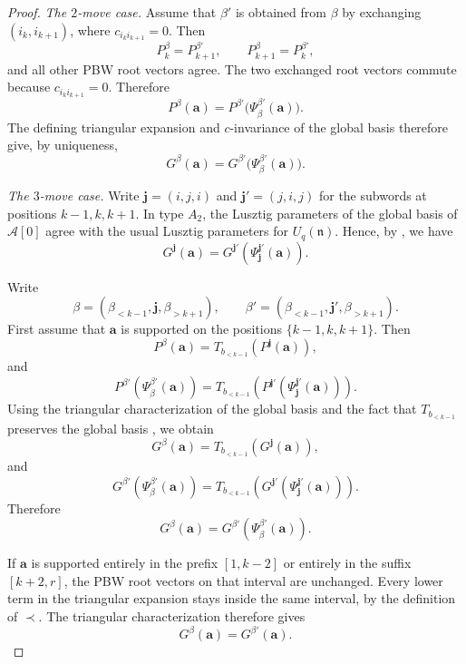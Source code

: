 \documentclass[12pt, reqno]{amsart}
\theoremstyle{plain}
\theoremstyle{definition}
\numberwithin{equation}{section}
\begin{document}
\begin{proof}
\emph{The \(2\)-move case.}
Assume that \(\beta'\) is obtained from \(\beta\) by exchanging
\((i_k,i_{k+1})\), where \(c_{i_ki_{k+1}}=0\). Then
\[
P_k^\beta=P_{k+1}^{\beta'},
\qquad
P_{k+1}^\beta=P_k^{\beta'},
\]
and all other PBW root vectors agree. The two exchanged root vectors
commute because $c_{i_ki_{k+1}}=0$. Therefore
\[
P^\beta(\mathbf a)
=
P^{\beta'}\bigl(\Psi_\beta^{\beta'}(\mathbf a)\bigr).
\]
The defining triangular expansion and $c$-invariance of the global basis
therefore give, by uniqueness,
\[
G^\beta(\mathbf a)
=
G^{\beta'}\bigl(\Psi_\beta^{\beta'}(\mathbf a)\bigr).
\]

\medskip
\noindent\emph{The \(3\)-move case.}
Write $\mathbf j=(i,j,i)$ and $\mathbf j'=(j,i,j)$ for the subwords
at positions $k-1,k,k+1$.
In type \(A_2\), the Lusztig parameters of the global basis of
\(\widehat{\mathcal A}[0]\) agree with the usual Lusztig parameters for
\(U_q(\mathfrak n)\). Hence, by
\cite[Proposition~5.2]{kamnitzer2010mirkovic}, we have
\[
G^{\mathbf j}(\mathbf a)
=
G^{\mathbf j'}\!\left(\Psi_{\mathbf j}^{\mathbf j'}(\mathbf a)\right).
\]

Write
\[
\beta=(\beta_{<k-1},\mathbf j,\beta_{>k+1}),
\qquad
\beta'=(\beta_{<k-1},\mathbf j',\beta_{>k+1}).
\]
First assume that \(\mathbf a\) is supported on the positions
\(\{k-1,k,k+1\}\). Then
\[
P^\beta(\mathbf a)
=
T_{b_{<k-1}}\!\left(P^{\mathbf j}(\mathbf a)\right),
\]
and
\[
P^{\beta'}\!\left(\Psi_\beta^{\beta'}(\mathbf a)\right)
=
T_{b_{<k-1}}\!\left(
P^{\mathbf j'}\!\left(\Psi_{\mathbf j}^{\mathbf j'}(\mathbf a)\right)
\right).
\]
Using the triangular characterization of the global basis and the fact that
\(T_{b_{<k-1}}\) preserves the global basis
\cite[Theorem~3.7]{kashiwara2024braid}, we obtain
\[
G^\beta(\mathbf a)
=
T_{b_{<k-1}}\!\left(G^{\mathbf j}(\mathbf a)\right),
\]
and
\[
G^{\beta'}\!\left(\Psi_\beta^{\beta'}(\mathbf a)\right)
=
T_{b_{<k-1}}\!\left(
G^{\mathbf j'}\!\left(\Psi_{\mathbf j}^{\mathbf j'}(\mathbf a)\right)
\right).
\]
Therefore
\[
G^\beta(\mathbf a)
=
G^{\beta'}\!\left(\Psi_\beta^{\beta'}(\mathbf a)\right).
\]

If $\mathbf a$ is supported entirely in the prefix $[1,k-2]$ or
entirely in the suffix $[k+2,r]$, the PBW root vectors on that interval
are unchanged. Every lower term in the triangular expansion stays inside
the same interval, by the definition of $\prec$. The triangular
characterization therefore gives
\[
    G^\beta(\mathbf a)=G^{\beta'}(\mathbf a).
\]


\end{proof}
\end{document}
